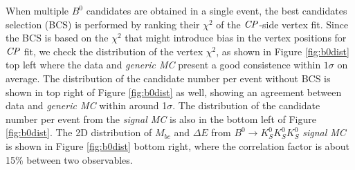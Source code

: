 When multiple $B^0$ candidates are obtained in a single event, the best candidates selection (BCS) is performed by ranking their $\chi^2$ of the $\it{CP}$-side vertex fit. Since the BCS is based on the $\chi^2$ that might introduce bias in the vertex positions for $\it{CP}$ fit, we check the distribution of the vertex $\chi^2$, as shown in Figure \ref{fig:b0dist} top left where the data and \textit{generic MC} present a good consistence within $1\sigma$ on average. The distribution of the candidate number per event without BCS is shown in top right of Figure \ref{fig:b0dist} as well, showing an agreement between data and \textit{generic MC} within around 1$\sigma$. The distribution of the candidate number per event from the \textit{signal MC} is also in the bottom left of Figure \ref{fig:b0dist}. The 2D distribution of $M_{bc}$ and $\Delta E$ from $B^0 \to K_S^0  K_S^0  K_S^0$ \textit{signal MC} is shown in Figure \ref{fig:b0dist}  bottom right, where the correlation factor is about 15\% between two observables. 
 
